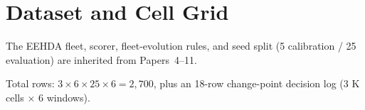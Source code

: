 \section{Dataset and Cell Grid}

The EEHDA fleet, scorer, fleet-evolution rules, and seed split
(5 calibration / 25 evaluation) are inherited from Papers~4--11.



Total rows: $3 \times 6 \times 25 \times 6 = 2{,}700$, plus an 18-row
change-point decision log (3 K cells $\times$ 6 windows).
